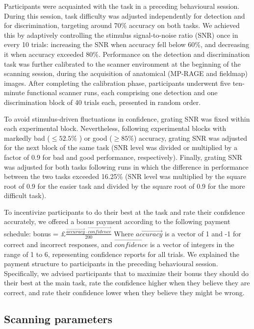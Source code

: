 \documentclass[12pt,twoside]{reedthesis}
\begin{document}
Participants were acquainted with the task in a preceding behavioural session. During this session, task difficulty was adjusted independently for detection and for discrimination, targeting around 70\% accuracy on both tasks. We achieved this by adaptively controlling the stimulus signal-to-noise ratio (SNR) once in every 10 trials: increasing the SNR when accuracy fell below 60\%, and decreasing it when accuracy exceeded 80\%. Performance on the detection and discrimination task was further calibrated to the scanner environment at the beginning of the scanning session, during the acquisition of anatomical (MP-RAGE and fieldmap) images. After completing the calibration phase, participants underwent five ten-minute functional scanner runs, each comprising one detection and one discrimination block of 40 trials each, presented in random order.

To avoid stimulus-driven fluctuations in confidence, grating SNR was fixed within each experimental block. Nevertheless, following experimental blocks with markedly bad (\(\leq52.5\%\) ) or good (\(\geq85\%\)) accuracy, grating SNR was adjusted for the next block of the same task (SNR level was divided or multiplied by a factor of 0.9 for bad and good performance, respectively). Finally, grating SNR was adjusted for both tasks following runs in which the difference in performance between the two tasks exceeded 16.25\% (SNR level was multiplied by the square root of 0.9 for the easier task and divided by the square root of 0.9 for the more difficult task).

To incentivize participants to do their best at the task and rate their confidence accurately, we offered a bonus payment according to the following payment schedule:
bonus = £\(\frac{\overrightarrow{accuracy} \cdot \overrightarrow{confidence}}{200}\)
Where \(\overrightarrow{accuracy}\) is a vector of 1 and -1 for correct and incorrect responses, and \(\overrightarrow{confidence}\) is a vector of integers in the range of 1 to 6, representing confidence reports for all trials. We explained the payment structure to participants in the preceding behavioural session. Specifically, we advised participants that to maximize their bonus they should do their best at the main task, rate the confidence higher when they believe they are correct, and rate their confidence lower when they believe they might be wrong.

\hypertarget{scanning-parameters}{%
\subsection{Scanning parameters}\label{scanning-parameters}}
\end{document}
